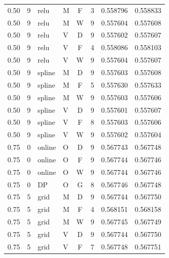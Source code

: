 \begin{longtable}{rrllcrrr}
0.50 & 9 & relu & M & F & 3 & 0.558796 & 0.558833 \\

0.50 & 9 & relu & M & W & 9 & 0.557604 & 0.557608 \\

0.50 & 9 & relu & V & D & 9 & 0.557602 & 0.557607 \\

0.50 & 9 & relu & V & F & 4 & 0.558086 & 0.558103 \\

0.50 & 9 & relu & V & W & 9 & 0.557604 & 0.557607 \\

0.50 & 9 & spline & M & D & 9 & 0.557603 & 0.557608 \\

0.50 & 9 & spline & M & F & 5 & 0.557630 & 0.557633 \\

0.50 & 9 & spline & M & W & 9 & 0.557603 & 0.557606 \\

0.50 & 9 & spline & V & D & 9 & 0.557601 & 0.557607 \\

0.50 & 9 & spline & V & F & 8 & 0.557603 & 0.557606 \\

0.50 & 9 & spline & V & W & 9 & 0.557602 & 0.557604 \\

0.75 & 0 & online & O & D & 9 & 0.567743 & 0.567748 \\

0.75 & 0 & online & O & F & 9 & 0.567744 & 0.567746 \\

0.75 & 0 & online & O & W & 9 & 0.567744 & 0.567746 \\

0.75 & 0 & DP & O & G & 8 & 0.567746 & 0.567748 \\

0.75 & 5 & grid & M & D & 9 & 0.567744 & 0.567750 \\

0.75 & 5 & grid & M & F & 4 & 0.568151 & 0.568158 \\

0.75 & 5 & grid & M & W & 9 & 0.567745 & 0.567749 \\

0.75 & 5 & grid & V & D & 9 & 0.567744 & 0.567750 \\

0.75 & 5 & grid & V & F & 7 & 0.567748 & 0.567751 \\


\end{longtable}
